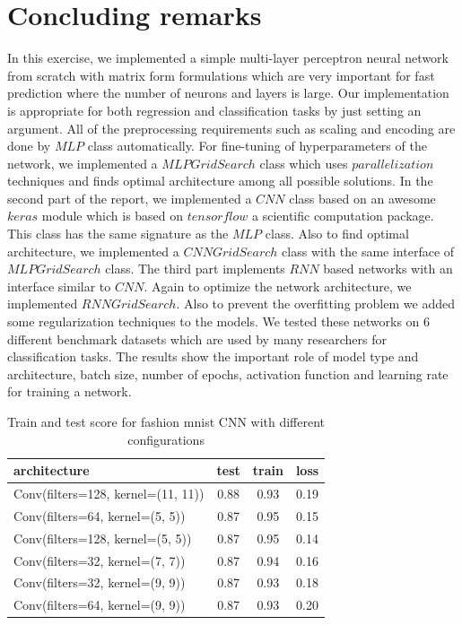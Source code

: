 \documentclass[10pt]{SelfArx} %
\begin{document}
	\section{Concluding remarks}
	In this exercise, we implemented a simple multi-layer perceptron neural network from scratch with matrix form formulations which are very important for fast prediction where the number of neurons and layers is large. Our implementation is appropriate for both regression and classification tasks by just setting an argument. All of the preprocessing requirements such as scaling and encoding are done by $MLP$ class automatically. For fine-tuning of hyperparameters of the network, we implemented a $MLPGridSearch$ class which uses $parallelization$ techniques and finds optimal architecture among all possible solutions.  
	In the second part of the report, we implemented a $CNN$ class based on an awesome $keras$ module which is based on $tensorflow$ a scientific computation package. This class has the same signature as the $MLP$ class. Also to find optimal architecture, we implemented a $CNNGridSearch$ class with the same interface of $MLPGridSearch$ class. The third part implements $RNN$ based networks with an interface similar to $CNN$. Again to optimize the network architecture, we implemented $RNNGridSearch$. Also to prevent the overfitting problem we added some regularization techniques to the models. We tested these networks on 6 different benchmark datasets which are used by many researchers for classification tasks. The results show the important role of model type and architecture, batch size, number of epochs, activation function and learning rate for training a network. 
	
	\begin{table}[]
		\begin{tabular*}{1\linewidth}{@{\extracolsep{\fill} }lccc@{}}
			\toprule
			architecture & test & train & loss \\ \midrule
			Conv(filters=128, kernel=(11, 11)) & 0.88 & 0.93 & 0.19 \\
			Conv(filters=64, kernel=(5, 5)) & 0.87 & 0.95 & 0.15 \\
			Conv(filters=128, kernel=(5, 5)) & 0.87 & 0.95 & 0.14 \\
			Conv(filters=32, kernel=(7, 7)) & 0.87 & 0.94 & 0.16 \\
			Conv(filters=32, kernel=(9, 9)) & 0.87 & 0.93 & 0.18 \\
			Conv(filters=64, kernel=(9, 9)) & 0.87 & 0.93 & 0.20 \\ \bottomrule
		\end{tabular*}
		\caption{Train and test score for fashion mnist CNN  with different configurations}
		\label{tfashion1}
	\end{table}
	
\end{document}
